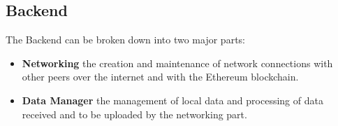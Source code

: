 \subsection{Backend}\label{subsec:backend}

The Backend can be broken down into two major parts:

\begin{itemize}
  \item \textbf{Networking} the creation and maintenance of network connections with other peers over the internet and with the Ethereum blockchain.
  \item \textbf{Data Manager} the management of local data and processing of data received and to be uploaded by the networking part.
\end{itemize}




